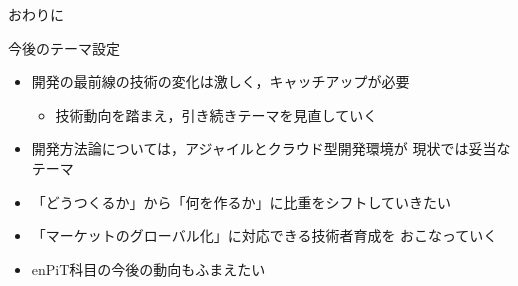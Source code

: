 \documentclass[t]{beamer}
\begin{document}
\begin{frame}[label=sec-10]{おわりに}
\begin{block}{今後のテーマ設定}
\begin{itemize}
\item 開発の最前線の技術の変化は激しく，キャッチアップが必要
\begin{itemize}
\item 技術動向を踏まえ，引き続きテーマを見直していく
\end{itemize}
\item 開発方法論については，アジャイルとクラウド型開発環境が
現状では妥当なテーマ
\item 「どうつくるか」から「何を作るか」に比重をシフトしていきたい
\item 「マーケットのグローバル化」に対応できる技術者育成を
おこなっていく
\item enPiT科目の今後の動向もふまえたい
\end{itemize}
\end{block}
\end{frame}
\end{document}
